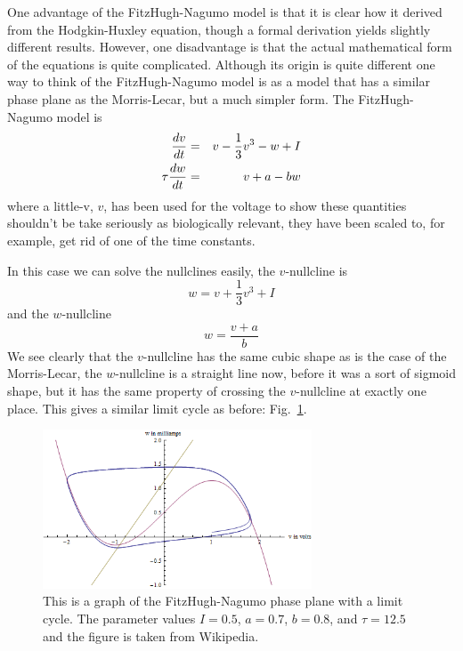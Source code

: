 \documentclass[12pt]{article}
\begin{document}
One advantage of the FitzHugh-Nagumo model
\cite{FitzHugh1955,Nagumo1962} is that it is clear how it derived from
the Hodgkin-Huxley equation, though a formal derivation yields
slightly different results. However, one disadvantage is that the
actual mathematical form of the equations is quite
complicated. Although its origin is quite different one way to think
of the FitzHugh-Nagumo model is as a model that has a similar phase
plane as the Morris-Lecar, but a much simpler form. The
FitzHugh-Nagumo model is
\begin{eqnarray}
\frac{dv}{dt}&=&v-\frac{1}{3}v^3-w+I\cr
\tau\frac{dw}{dt}&=&v+a-bw
\end{eqnarray}
where a little-v, $v$, has been used for the voltage to show these
quantities shouldn't be take seriously as biologically relevant, they
have been scaled to, for example, get rid of one of the time
constants. 

In this case we can solve the nullclines easily, the $v$-nullcline is
\begin{equation}
w=v+\frac{1}{3}v^3+I
\end{equation}
and the $w$-nullcline
\begin{equation}
w=\frac{v+a}{b}
\end{equation}
We see clearly that the $v$-nullcline has the same cubic shape as is
the case of the Morris-Lecar, the $w$-nullcline is a straight line
now, before it was a sort of sigmoid shape, but it has the same
property of crossing the $v$-nullcline at exactly one place. This gives a similar limit cycle as before: Fig.~\ref{FHN_phase}.

\begin{figure}
\begin{center}
\includegraphics[width=8cm]{FHN_phase.png}
\end{center}
\caption{This is a graph of the FitzHugh-Nagumo phase plane with a limit cycle. The parameter values $I=0.5$, $a=0.7$, $b=0.8$, and $\tau=12.5$ and the figure is taken from Wikipedia.\label{FHN_phase}}
\end{figure}
\end{document}
